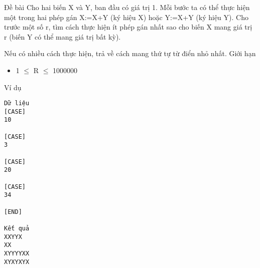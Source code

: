 Đề bài
Cho hai biến X và Y, ban đầu có giá trị 1. Mỗi bước ta có thể thực hiện một trong hai phép gán X:=X+Y (ký hiệu X) hoặc Y:=X+Y (ký hiệu Y). Cho trước một số r, tìm cách thực hiện ít phép gán nhất sao cho biến X mang giá trị r (biến Y có thể mang giá trị bất kỳ).  

   Nếu có nhiều cách thực hiện, trả về cách mang thứ tự từ điển nhỏ nhất.
Giới hạn
\begin{itemize}
	\item     1  $\le$  R  $\le$  1000000   
\end{itemize}
Ví dụ
\begin{verbatim}
Dữ liệu
[CASE]
10

[CASE]
3

[CASE]
20

[CASE]
34

[END]

Kết quả
XXYYX
XX
XYYYYXX
XYXYXYX
\end{verbatim}